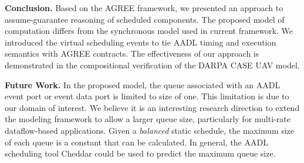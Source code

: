 {\bf Conclusion.}
Based on the AGREE framework, we presented an approach to assume-guarantee reasoning of scheduled components. The proposed model of computation differs from the synchronous model used in current framework. We introduced the virtual scheduling events to tie AADL timing and execution semantics with AGREE contracts. The effectiveness of our approach is demonstrated in the compositional verification of the DARPA CASE UAV model.

{\bf Future Work.}
In the proposed model, the queue associated with an AADL event port or event data port is limited to size of one. This limitation is due to our domain of interest. We believe it is an interesting research direction to extend the modeling framework to allow a larger queue size, particularly for multi-rate dataflow-based applications. Given a \emph{balanced} static schedule, the maximum size of each queue is a constant that can be calculated. In general, the AADL scheduling tool Cheddar could be used to predict the maximum queue size.
